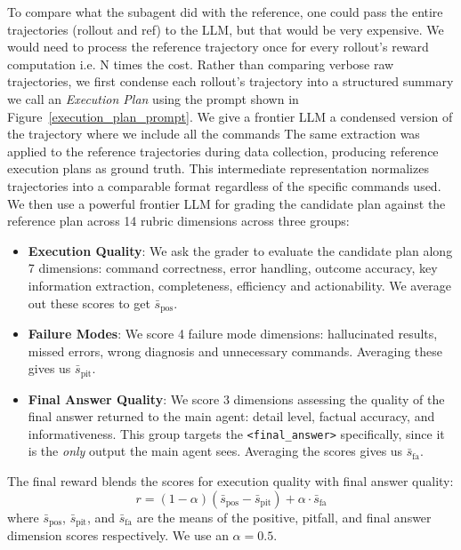 \documentclass[sigconf,review]{acmart}
\begin{document}
To compare what the subagent did with the reference, one could pass the entire trajectories (rollout and ref) to the LLM, but that would be very expensive. We would need to process the reference trajectory once for every rollout's reward computation i.e. N times the cost. Rather than comparing verbose raw trajectories, we first condense each rollout's trajectory into a structured summary we call an \textit{Execution Plan} using the prompt shown in Figure~\ref{execution_plan_prompt}. We give a frontier LLM a condensed version of the trajectory where we include all the commands
The same extraction was applied to the reference trajectories during data collection, producing reference execution plans as ground truth. This intermediate representation normalizes trajectories into a comparable format regardless of the specific commands used. We then use a powerful frontier LLM for grading the candidate plan against the reference plan across 14 rubric dimensions across three groups:
\begin{itemize}
    \item \textbf{Execution Quality}: We ask the grader to evaluate the candidate plan along 7 dimensions: command correctness, error handling, outcome accuracy, key information extraction, completeness, efficiency and actionability. We average out these scores to get $\bar{s}_{\text{pos}}$.
    \item \textbf{Failure Modes}: We score 4 failure mode dimensions: hallucinated results, missed errors, wrong diagnosis and unnecessary commands. Averaging these gives us $\bar{s}_{\text{pit}}$.
    \item \textbf{Final Answer Quality}: We score 3 dimensions assessing the quality of the final answer returned to the main agent: detail level, factual accuracy, and informativeness. This group targets the \texttt{<final\_answer>} specifically, since it is the \textit{only} output the main agent sees. Averaging the scores gives us $\bar{s}_{\text{fa}}$.
\end{itemize}

The final reward blends the scores for execution quality with final answer quality:
\begin{equation}
r = (1 - \alpha)(\bar{s}_{\text{pos}} -
\bar{s}_{\text{pit}}) + \alpha \cdot
\bar{s}_{\text{fa}}
\label{eq:reward}
\end{equation}
where $\bar{s}_{\text{pos}}$, $\bar{s}_{\text{pit}}$, and
$\bar{s}_{\text{fa}}$ are the means of the positive, pitfall, and final answer dimension scores respectively. We use an $\alpha=0.5$.
\end{document}
